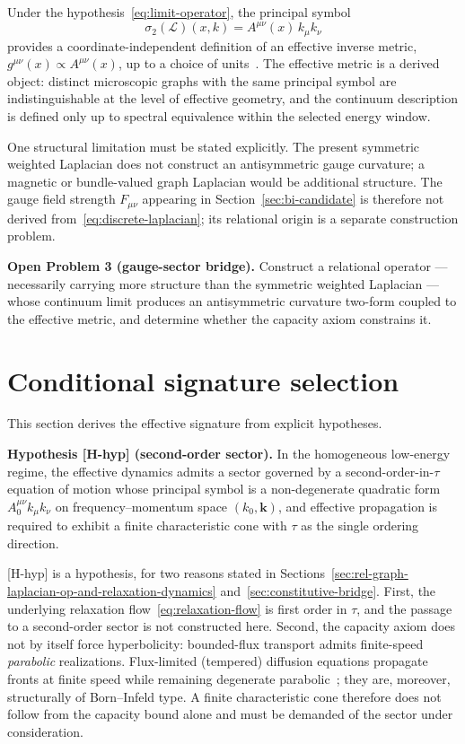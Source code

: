\documentclass[epj]{svjour}
\begin{document}
  Under the hypothesis~\eqref{eq:limit-operator}, the principal symbol
  \begin{equation}
    \sigma_2(\mathcal{L})(x,k)=A^{\mu\nu}(x)\,k_\mu k_\nu
  \end{equation}
  provides a coordinate-independent definition of an effective inverse metric,
  $g^{\mu\nu}(x) \propto A^{\mu\nu}(x)$, up to a choice of units~\cite{Beau2026a}.
  The effective metric is a derived object: distinct microscopic graphs with the same principal
  symbol are indistinguishable at the level of effective geometry, and the continuum description is
  defined only up to spectral equivalence within the selected energy window.

  One structural limitation must be stated explicitly.
  The present symmetric weighted Laplacian does not construct an antisymmetric gauge curvature; a
  magnetic or bundle-valued graph Laplacian would be additional structure.
  The gauge field strength $F_{\mu\nu}$ appearing in Section~\ref{sec:bi-candidate} is therefore
  not derived from~\eqref{eq:discrete-laplacian}; its relational origin is a separate construction
  problem.

  \medskip
  \noindent\textbf{Open Problem 3 (gauge-sector bridge).}
  Construct a relational operator --- necessarily carrying more structure than the symmetric
  weighted Laplacian --- whose continuum limit produces an antisymmetric curvature two-form coupled
  to the effective metric, and determine whether the capacity axiom constrains it.
  \medskip

  \section{Conditional signature selection}
  \label{sec:minkowski-emergence}

  This section derives the effective signature from explicit hypotheses.

  \medskip
  \noindent\textbf{Hypothesis [H-hyp] (second-order sector).}
  In the homogeneous low-energy regime, the effective dynamics admits a sector governed by a
  second-order-in-$\tau$ equation of motion whose principal symbol is a non-degenerate quadratic
  form $A^{\mu\nu}_0 k_\mu k_\nu$ on frequency--momentum space $(k_0, \mathbf{k})$, and effective
  propagation is required to exhibit a finite characteristic cone with $\tau$ as the single
  ordering direction.
  \medskip

  [H-hyp] is a hypothesis, for two reasons stated in
  Sections~\ref{sec:rel-graph-laplacian-op-and-relaxation-dynamics}
  and~\ref{sec:constitutive-bridge}.
  First, the underlying relaxation flow~\eqref{eq:relaxation-flow} is first order in $\tau$, and the
  passage to a second-order sector is not constructed here.
  Second, the capacity axiom does not by itself force hyperbolicity: bounded-flux transport admits
  finite-speed \emph{parabolic} realizations.
  Flux-limited (tempered) diffusion equations propagate fronts at finite speed while remaining
  degenerate parabolic~\cite{Rosenau1992}; they are, moreover, structurally of Born--Infeld type.
  A finite characteristic cone therefore does not follow from the capacity bound alone and must be
  demanded of the sector under consideration.
\end{document}
